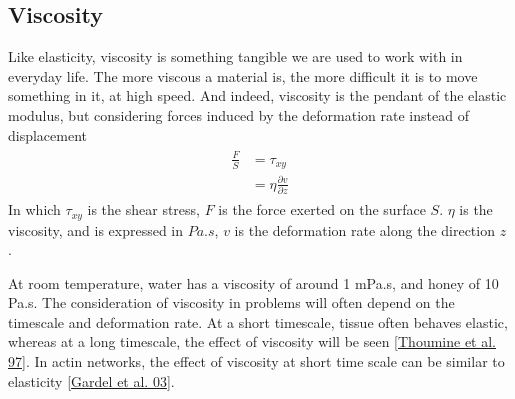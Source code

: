 \documentclass[A4paperpaper,11pt,english]{sphinxmanual}
\begin{document}
\subsection{Viscosity}
\label{parts/part1:viscosity}
Like elasticity, viscosity is something tangible we are used to work with in
everyday life. The more viscous a material is, the more difficult it is to move
something in it, at high speed. And indeed, viscosity is the pendant of the elastic
modulus, but considering forces induced by the deformation rate instead of displacement
\label{parts/part1:equation-eqa12}\begin{gather}
\begin{split}\frac{F}{S} &= \tau_{xy} \\
            &= \eta \frac{\partial v}{\partial z}\end{split}\label{parts/part1-eqa12}
\end{gather}
In which \(\tau_{xy}\) is the shear stress, \(F\) is the force exerted
on the surface \(S\). \(\eta\) is the viscosity, and is expressed in
\(Pa.s\), \(v\) is the deformation rate along the direction \(z\) .

At room temperature, water has a viscosity of around 1 mPa.s, and honey of 10 Pa.s. The consideration of viscosity in problems will
often depend on the timescale and deformation rate. At a short
timescale, tissue often behaves elastic, whereas at a long timescale, the effect
of viscosity will be seen {\hyperref[parts/part1:thoumine1997]{{[}Thoumine et al. 97{]}}}. In actin networks, the effect of
viscosity at short time scale can be similar to elasticity {\hyperref[parts/part1:gardel2003]{{[}Gardel et al. 03{]}}}.
\end{document}
